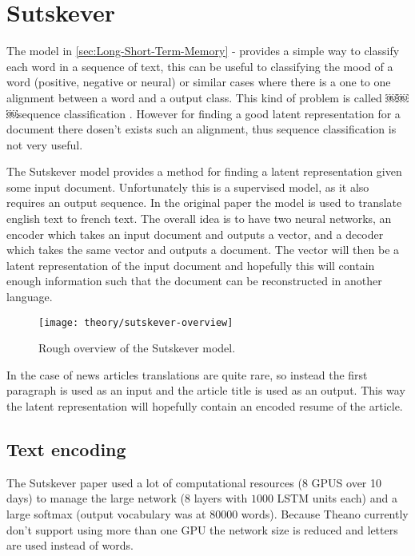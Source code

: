 
\section{Sutskever}

The model in \autoref{sec:Long-Short-Term-Memory} -  provides a simple way to classify each word in a sequence of text, this can be useful to classifying the mood of a word (positive, negative or neural) or similar cases where there is a one to one alignment between a word and a output class. This kind of problem is called ￼￼￼sequence classification \cite[p.~10]{alexgraves}. However for finding a good latent representation for a document there dosen't exists such an alignment, thus sequence classification is not very useful.

The Sutskever model provides a method for finding a latent representation given some input document. Unfortunately this is a supervised model, as it also requires an output sequence. In the original paper \cite{sutskever} the model is used to translate english text to french text. The overall idea is to have two neural networks, an encoder which takes an input document and outputs a vector, and a decoder which takes the same vector and outputs a document. The vector will then be a latent representation of the input document and hopefully this will contain enough information such that the document can be reconstructed in another language.

\begin{figure}[H]
	\centering
	\texttt{[image: theory/sutskever-overview]}
	\caption{Rough overview of the Sutskever model.}
\end{figure}

In the case of news articles translations are quite rare, so instead the first paragraph is used as an input and the article title is used as an output. This way the latent representation will hopefully contain an encoded resume of the article.

\subsection{Text encoding}

The Sutskever paper \cite{sutskever} used a lot of computational resources (8 GPUS over 10 days) to manage the large network (8 layers with $1000$ LSTM units each) and a large softmax (output vocabulary was at 80000 words). Because Theano currently don't support using more than one GPU the network size is reduced and letters are used instead of words.

